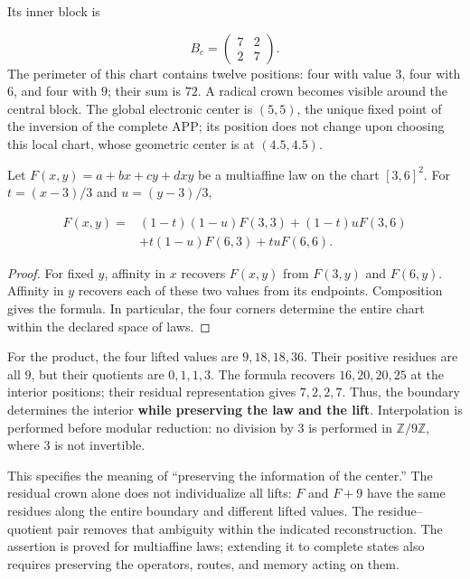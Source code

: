 Its inner block is

\[
B_c=\begin{pmatrix}7&2\\2&7\end{pmatrix}.
\]
The perimeter of this chart contains twelve positions: four with value \(3\), four with \(6\), and four with \(9\); their sum is \(72\). A radical crown becomes visible around the central block. The global electronic center is \((5,5)\), the unique fixed point of the inversion of the complete APP; its position does not change upon choosing this local chart, whose geometric center is at \((4.5,4.5)\).

\begin{proposition}
\label{prop:centro-frontera-recuperacion}
Let \(F(x,y)=a+bx+cy+dxy\) be a multiaffine law on the chart \([3,6]^2\). For \(t=(x-3)/3\) and \(u=(y-3)/3\),

\[
\begin{aligned}
F(x,y)={}&(1-t)(1-u)F(3,3)+(1-t)uF(3,6)\\
&+t(1-u)F(6,3)+tuF(6,6).
\end{aligned}
\]
\end{proposition}
\begin{proof}
For fixed \(y\), affinity in \(x\) recovers \(F(x,y)\) from \(F(3,y)\) and \(F(6,y)\). Affinity in \(y\) recovers each of these two values from its endpoints. Composition gives the formula. In particular, the four corners determine the entire chart within the declared space of laws.
\end{proof}

For the product, the four lifted values are \(9,18,18,36\). Their positive residues are all \(9\), but their quotients are \(0,1,1,3\). The formula recovers \(16,20,20,25\) at the interior positions; their residual representation gives \(7,2,2,7\). Thus, the boundary determines the interior \textbf{while preserving the law and the lift}. Interpolation is performed before modular reduction: no division by \(3\) is performed in \(\mathbb Z/9\mathbb Z\), where \(3\) is not invertible.

This specifies the meaning of “preserving the information of the center.” The residual crown alone does not individualize all lifts: \(F\) and \(F+9\) have the same residues along the entire boundary and different lifted values. The residue–quotient pair removes that ambiguity within the indicated reconstruction. The assertion is proved for multiaffine laws; extending it to complete states also requires preserving the operators, routes, and memory acting on them.

